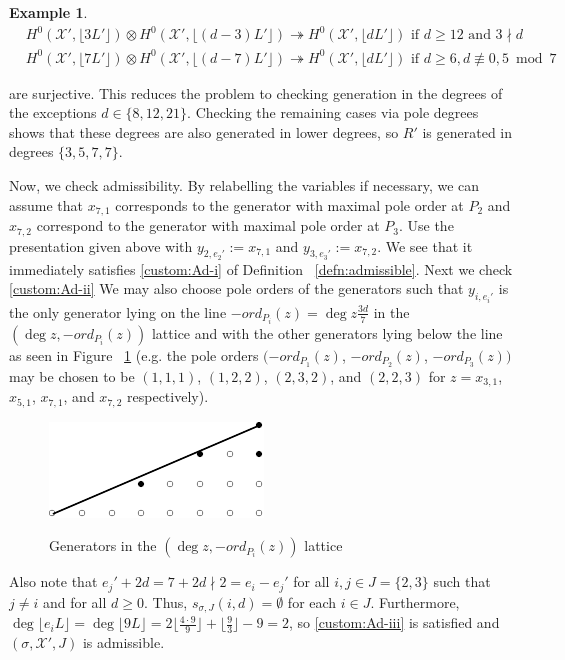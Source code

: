 \documentclass{amsart}
\theoremstyle{plain}
\theoremstyle{definition}
\newtheorem{example}[thm]{Example}
\theoremstyle{remark}
\numberwithin{equation}{section}
\newcommand\sx{\mathscr X}
\newcommand{\halfcan}{L}
\begin{document}
\begin{example}
\begin{align*}
	&H^0 (\sx', \lfloor 3 \halfcan' \rfloor) \otimes H^0 (\sx', \lfloor
	(d - 3) \halfcan' \rfloor) \twoheadrightarrow H^0 (\sx', \lfloor
	d \halfcan' \rfloor) \text{ if } d \geq 12 \text{ and } 3 \nmid d \\
	&H^0 (\sx', \lfloor 7 \halfcan' \rfloor) \otimes H^0 (\sx', \lfloor
	(d - 7) \halfcan' \rfloor) \twoheadrightarrow H^0 (\sx', \lfloor
	d \halfcan' \rfloor) \text{ if } d \geq 6, d \not\equiv 0, 5
	\bmod 7
\end{align*}

\noindent
are surjective. This reduces the problem to checking generation
in the degrees of the exceptions $d \in \{8, 12, 21\}$.
Checking the remaining cases via pole degrees shows that
these degrees are also generated in lower degrees,
so $R'$ is generated in degrees $\{3, 5, 7, 7\}$.

Now, we check admissibility. By relabelling the
variables if necessary, we can assume that $x_{7, 1}$ corresponds
to the generator with maximal pole order at $P_2$ and $x_{7, 2}$
correspond to the generator with maximal pole order at $P_3$. Use
the presentation given above with $y _{2, e_2'} := x_{7, 1}$ and
$y_{3, e_3'} :=  x_{7, 2}$. We see that it immediately satisfies
\ref{custom:Ad-i} of Definition ~\ref{defn:admissible}. Next we check \ref{custom:Ad-ii} We may also choose
pole orders of the generators such that $y_{i, e_i'}$ is the only
generator lying on the line $-ord_{P_i}(z) = \deg z \frac{3d}{7}$
in the $(\deg z, -ord_{P_i}(z))$  lattice and with the other
generators lying below the line as seen in Figure ~\ref{fig:377}
(e.g. the pole orders $(-ord_{P_1}(z)$, $-ord_{P_2}(z)$, $-ord_{P_3}
(z))$ may be chosen to be $(1, 1, 1)$, $(1, 2, 2)$, $(2, 3, 2)$,
and $(2, 2, 3)$ for $z = x_{3, 1}$, $x_{5, 1}$, $x_{7, 1}$, and
$x_{7, 2}$ respectively).

\begin{figure}[H]
\includegraphics{pics/spin-377-pic-pics.pdf} \\
\caption{Generators in the $(\deg z, -ord_{P_i}(z))$ lattice}
\label{fig:377}
\end{figure}

Also note that $e_j' + 2d = 7 + 2d \nmid 2 = e_i - e_j'$ for all
$i, j \in J = \{2, 3\}$ such that $j \neq i$ and for all $d \geq
0$. Thus, $s_{\sigma, J}(i, d) = \emptyset$ for each $i \in J$.
Furthermore, $\deg \lfloor e_i \halfcan \rfloor = \deg \lfloor 9
\halfcan \rfloor = 2 \lfloor \frac{4 \cdot 9}{9} \rfloor + \lfloor
\frac{9}{3} \rfloor - 9 = 2$, so \ref{custom:Ad-iii} is satisfied and
$(\sigma, \sx', J)$ is admissible.


\end{example}
\end{document}
